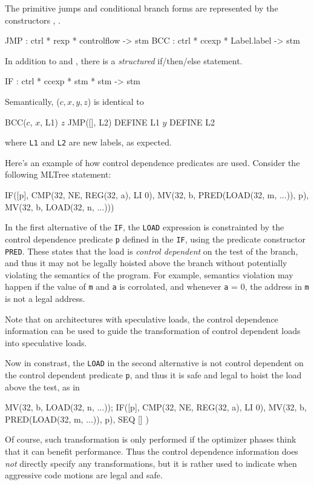 The primitive jumps and conditional branch forms are represented
by the constructors , .
\begin{SML}
   JMP : ctrl * rexp * controlflow  -> stm
   BCC : ctrl * ccexp * Label.label -> stm
\end{SML}

In addition to  and , 
there is a \emph{structured} if/then/else statement.
\begin{SML}
   IF  : ctrl * ccexp * stm * stm -> stm
\end{SML}

Semantically, ($c,x,y,z$) is identical to
\begin{SML}
   BCC(\(c\), \(x\), L1)
   \(z\)
   JMP([], L2)
   DEFINE L1
   \(y\)
   DEFINE L2
\end{SML}
where \verb|L1| and \verb|L2| are new labels, as expected.

Here's an example of how control dependence predicates are used.
Consider the following MLTree statement:
\begin{SML}
   IF([p], CMP(32, NE, REG(32, a), LI 0),
        MV(32, b, PRED(LOAD(32, m, ...)), p),
        MV(32, b, LOAD(32, n, ...)))
\end{SML}
In the first alternative of the \verb|IF|, the \verb|LOAD|
expression is constrainted by the control dependence 
predicate \verb|p| defined in the \verb|IF|,
using the predicate constructor \verb|PRED|.  These states that
the load is \emph{control dependent} on the test of the branch,
and thus it may not be legally hoisted above the branch without
potentially violating the semantics of the program. 
For example,
semantics violation may happen  if the value of \verb|m| and \verb|a|
is corrolated, and whenever \verb|a| = 0, the address in \verb|m| is
not a legal address. 

Note that on architectures with speculative loads, 
the control dependence information can be used to 
guide the transformation of control dependent loads into speculative loads.

Now in constrast, the \verb|LOAD| in the second alternative is not
control dependent on the control dependent predicate \verb|p|, and
thus it is safe and legal to hoist the load above the test, as in
\begin{SML}
   MV(32, b, LOAD(32, n, ...));
   IF([p], CMP(32, NE, REG(32, a), LI 0),
        MV(32, b, PRED(LOAD(32, m, ...)), p),
        SEQ []
     )
\end{SML}
Of course, such transformation is only performed if the optimizer
phases think that it can benefit performance.  Thus the control dependence
information does \emph{not} directly specify any transformations, but it
is rather used to indicate when aggressive code motions are legal and safe.

